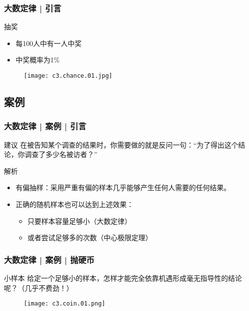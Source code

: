 \begin{frame}
  \frametitle{大数定律 | 引言}
  \begin{block}{抽奖}
    \begin{itemize}
      \item 每100人中有一人中奖
      \item 中奖概率为1\%
    \end{itemize}
    \vspace{-1em}
    \begin{figure}
      \centering
      \texttt{[image: c3.chance.01.jpg]}
    \end{figure}
  \end{block}
\end{frame}

\subsection{案例}
\begin{frame}
  \frametitle{大数定律 | 案例 | 引言}
  \begin{block}{建议}
    在被告知某个调查的结果时，你需要做的就是反问一句：“为了得出这个结论，你调查了多少名被访者？”
  \end{block}
  \pause \pause \pause \pause
  \begin{block}{解析}
    \begin{itemize}
      \item 有偏抽样：采用严重有偏的样本几乎能够产生任何人需要的任何结果。
      \item 正确的随机样本也可以达到上述效果：
        \begin{itemize}
          \item 只要样本容量足够小（大数定律）
          \item 或者尝试足够多的次数（中心极限定理）
        \end{itemize}
    \end{itemize}
  \end{block}
\end{frame}

\begin{frame}
  \frametitle{大数定律 | 案例 | 抛硬币}
  \begin{block}{小样本}
    给定一个足够小的样本，怎样才能完全依靠机遇形成毫无指导性的结论呢？（几乎不费劲！）
  \end{block}
  \begin{figure}
    \centering
    \texttt{[image: c3.coin.01.png]}
  \end{figure}
\end{frame}

